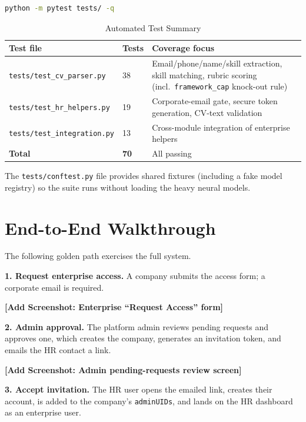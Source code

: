 \documentclass[12pt,a4paper,oneside]{report}
\begin{document}
\begin{lstlisting}[language=bash, caption={Running the backend test suite}]
python -m pytest tests/ -q
\end{lstlisting}

\begin{table}[H]
\centering
\caption{Automated Test Summary}
\label{tab:tests}
\begin{tabularx}{\textwidth}{L{5cm}C{1.5cm}X}
\toprule
\textbf{Test file} & \textbf{Tests} & \textbf{Coverage focus} \\
\midrule
\texttt{tests/test\_cv\_parser.py}    & 38 & Email/phone/name/skill extraction, skill matching, rubric scoring (incl.\ \texttt{framework\_cap} knock-out rule) \\
\texttt{tests/test\_hr\_helpers.py}   & 19 & Corporate-email gate, secure token generation, CV-text validation \\
\texttt{tests/test\_integration.py}   & 13 & Cross-module integration of enterprise helpers \\
\midrule
\textbf{Total}                        & \textbf{70} & All passing \\
\bottomrule
\end{tabularx}
\end{table}

The \texttt{tests/conftest.py} file provides shared fixtures (including a fake model registry)
so the suite runs without loading the heavy neural models.

\section{End-to-End Walkthrough}
\label{sec:e2e}

The following golden path exercises the full system.

\textbf{1. Request enterprise access.} A company submits the access form; a corporate email is
required.

\textbf{[Add Screenshot: Enterprise ``Request Access'' form]}

\textbf{2. Admin approval.} The platform admin reviews pending requests and approves one,
which creates the company, generates an invitation token, and emails the HR contact a link.

\textbf{[Add Screenshot: Admin pending-requests review screen]}

\textbf{3. Accept invitation.} The HR user opens the emailed link, creates their account, is
added to the company's \texttt{adminUIDs}, and lands on the HR dashboard as an enterprise user.
\end{document}
